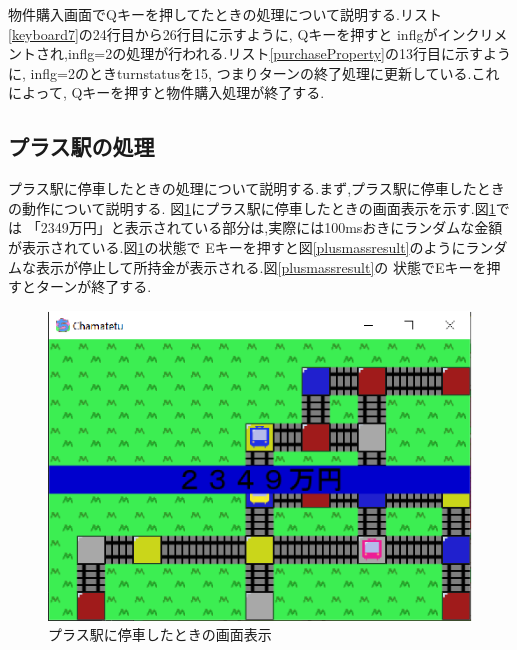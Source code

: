 \documentclass[a4j]{jarticle}
\begin{document}
    物件購入画面でQキーを押してたときの処理について説明する.リスト\ref{keyboard7}の24行目から26行目に示すように, Qキーを押すと
    inflgがインクリメントされ,inflg=2の処理が行われる.リスト\ref{purchaseProperty}の13行目に示すように, inflg=2のときturnstatusを15,
    つまりターンの終了処理に更新している.これによって, Qキーを押すと物件購入処理が終了する.
    
    \subsection{プラス駅の処理}
    プラス駅に停車したときの処理について説明する.まず,プラス駅に停車したときの動作について説明する.
    図\ref{plusmass}にプラス駅に停車したときの画面表示を示す.図\ref{plusmass}では
    「2349万円」と表示されている部分は,実際には100msおきにランダムな金額が表示されている.図\ref{plusmass}の状態で
    Eキーを押すと図\ref{plusmassresult}のようにランダムな表示が停止して所持金が表示される.図\ref{plusmassresult}の
    状態でEキーを押すとターンが終了する.

    \begin{figure}[H]
        \centering
        \includegraphics[scale=1.3]{plusmass.eps}
        \caption{プラス駅に停車したときの画面表示}
         \label{plusmass}
        \end{figure}
\end{document}
